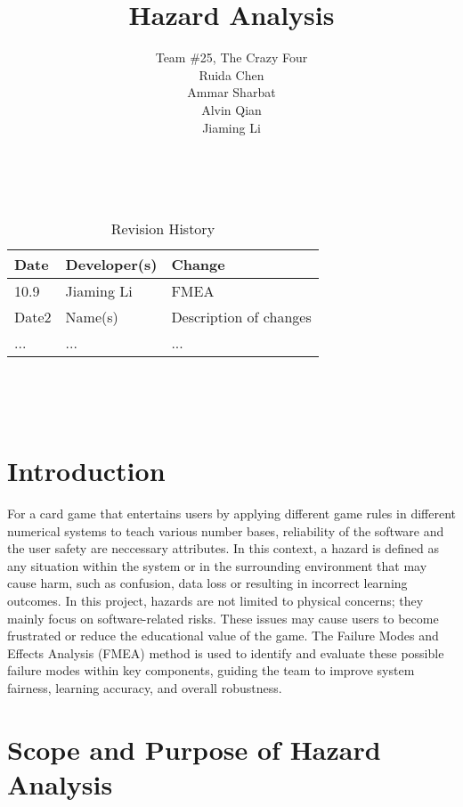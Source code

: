 \documentclass{article}
\title{Hazard Analysis\\\progname}
\author{
    Team \#25, The Crazy Four \\[1ex]
    Ruida Chen \\
    Ammar Sharbat \\
    Alvin Qian \\
    Jiaming Li
}
\date{}
\begin{document}
\maketitle
\thispagestyle{empty}

~\newpage


\begin{table}[hp]
\caption{Revision History} \label{TblRevisionHistory}
\begin{tabularx}{\textwidth}{llX}
\toprule
\textbf{Date} & \textbf{Developer(s)} & \textbf{Change}\\
\midrule
10.9 & Jiaming Li & FMEA\\
Date2 & Name(s) & Description of changes\\
... & ... & ...\\
\bottomrule
\end{tabularx}
\end{table}

~\newpage

\tableofcontents

~\newpage



\section{Introduction}

For a card game that entertains users by applying different game rules in different numerical systems to teach various number bases, reliability of the software and the user safety are neccessary attributes. In this context, a hazard is defined as any situation within the system or in the surrounding environment that may cause harm, such as confusion, data loss or resulting in incorrect learning outcomes. In this project, hazards are not limited to physical concerns; they mainly focus on software-related risks. These issues may cause users to become frustrated or reduce the educational value of the game. The Failure Modes and Effects Analysis (FMEA) method is used to identify and evaluate these possible failure modes within key components, guiding the team to improve system fairness, learning accuracy, and overall robustness.

\section{Scope and Purpose of Hazard Analysis}
\end{document}
